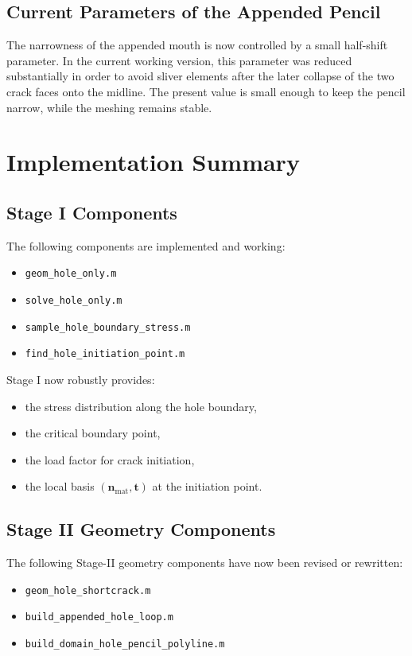 \documentclass[11pt]{article}
\begin{document}
	\subsection{Current Parameters of the Appended Pencil}
	
	The narrowness of the appended mouth is now controlled by a small half-shift parameter. In the current working version, this parameter was reduced substantially in order to avoid sliver elements after the later collapse of the two crack faces onto the midline. The present value is small enough to keep the pencil narrow, while the meshing remains stable.
	
	\section{Implementation Summary}
	
	\subsection{Stage I Components}
	
	The following components are implemented and working:
	\begin{itemize}
		\item \texttt{geom\_hole\_only.m}
		\item \texttt{solve\_hole\_only.m}
		\item \texttt{sample\_hole\_boundary\_stress.m}
		\item \texttt{find\_hole\_initiation\_point.m}
	\end{itemize}
	
	Stage I now robustly provides:
	\begin{itemize}
		\item the stress distribution along the hole boundary,
		\item the critical boundary point,
		\item the load factor for crack initiation,
		\item the local basis $(\bm{n}_{\mathrm{mat}},\bm{t})$ at the initiation point.
	\end{itemize}
	
	\subsection{Stage II Geometry Components}
	
	The following Stage-II geometry components have now been revised or rewritten:
	\begin{itemize}
		\item \texttt{geom\_hole\_shortcrack.m}
		\item \texttt{build\_appended\_hole\_loop.m}
		\item \texttt{build\_domain\_hole\_pencil\_polyline.m}
	\end{itemize}
	
\end{document}
